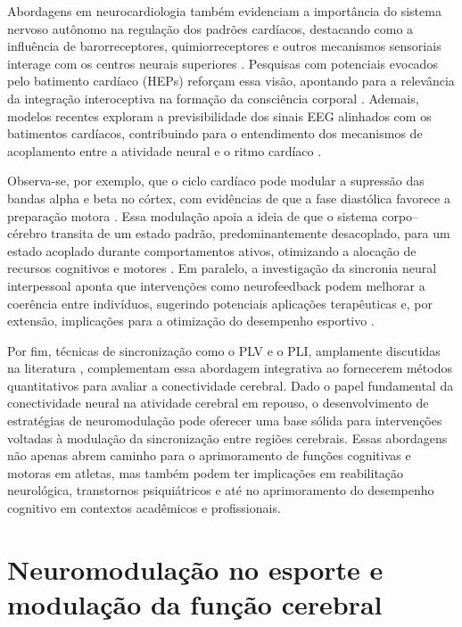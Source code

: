 Abordagens em neurocardiologia também evidenciam a importância do sistema nervoso autônomo na regulação dos padrões cardíacos, destacando como a influência de barorreceptores, quimiorreceptores e outros mecanismos sensoriais interage com os centros neurais superiores \cite{marcondes2024linguagem}. Pesquisas com potenciais evocados pelo batimento cardíaco (HEPs) reforçam essa visão, apontando para a relevância da integração interoceptiva na formação da consciência corporal \cite{park2018neural, banelli2020skipping, mackinnon2013utilizing}. Ademais, modelos recentes exploram a previsibilidade dos sinais EEG alinhados com os batimentos cardíacos, contribuindo para o entendimento dos mecanismos de acoplamento entre a atividade neural e o ritmo cardíaco \cite{vergara2024exploring}.

Observa-se, por exemplo, que o ciclo cardíaco pode modular a supressão das bandas alpha e beta no córtex, com evidências de que a fase diastólica favorece a preparação motora \cite{lai2024cardiac}. Essa modulação apoia a ideia de que o sistema corpo–cérebro transita de um estado padrão, predominantemente desacoplado, para um estado acoplado durante comportamentos ativos, otimizando a alocação de recursos cognitivos e motores \cite{criscuolo2022cognition}. Em paralelo, a investigação da sincronia neural interpessoal aponta que intervenções como neurofeedback podem melhorar a coerência entre indivíduos, sugerindo potenciais aplicações terapêuticas e, por extensão, implicações para a otimização do desempenho esportivo \cite{boecker2024interpersonal, konrad2024interpersonal}.

Por fim, técnicas de sincronização como o PLV e o PLI, amplamente discutidas na literatura \cite{seraj2018}, complementam essa abordagem integrativa ao fornecerem métodos quantitativos para avaliar a conectividade cerebral. Dado o papel fundamental da conectividade neural na atividade cerebral em repouso, o desenvolvimento de estratégias de neuromodulação pode oferecer uma base sólida para intervenções voltadas à modulação da sincronização entre regiões cerebrais. Essas abordagens não apenas abrem caminho para o aprimoramento de funções cognitivas e motoras em atletas, mas também podem ter implicações em reabilitação neurológica, transtornos psiquiátricos e até no aprimoramento do desempenho cognitivo em contextos acadêmicos e profissionais.

\section{Neuromodulação no esporte e modulação da função cerebral}

